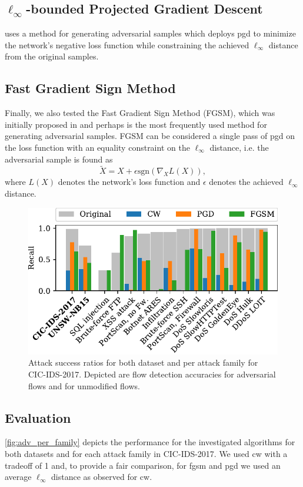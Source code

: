 \documentclass[conference]{IEEEtran}
\begin{document}
\subsection{$\ell_\infty$-bounded Projected Gradient Descent}
\cite{madry_towards_2018} uses a method for generating adversarial samples which deploys \gls{pgd}  to minimize the network's negative loss function while constraining the achieved $\ell_\infty$ distance from the original samples.

\subsection{Fast Gradient Sign Method}
Finally, we also tested the Fast Gradient Sign Method (FGSM), which was initially proposed in \cite{goodfellow_explaining_2015} and perhaps is the most frequently used method for generating adversarial samples. FGSM can be considered a single pass of \gls{pgd} on the loss function with an equality constraint on the $\ell_\infty$ distance, i.e. the adversarial sample is found as
\begin{equation}
\tilde X = X + \epsilon \text{sgn}( \nabla_X L(X)),
\end{equation}
where $L(X)$ denotes the network's loss function and $\epsilon$ denotes the achieved $\ell_\infty$ distance.


\begin{figure}[t]
\includegraphics[width=\columnwidth]{../plots/adv_comparison/adv_comparison_17.pdf}
\caption{Attack success ratios for both dataset and per attack family for CIC-IDS-2017. Depicted are flow detection accuracies for adversarial flows and for unmodified flows.}
\label{fig:adv_per_family}
\end{figure}


\subsection{Evaluation}
\autoref{fig:adv_per_family} depicts the performance for the investigated algorithms for both datasets and for each attack family in CIC-IDS-2017. 
We used \gls{cw} with a tradeoff of 1 and, to provide a fair comparison, for \gls{fgsm} and \gls{pgd} we used an average $\ell_\infty$ distance as observed for \gls{cw}.
\end{document}
